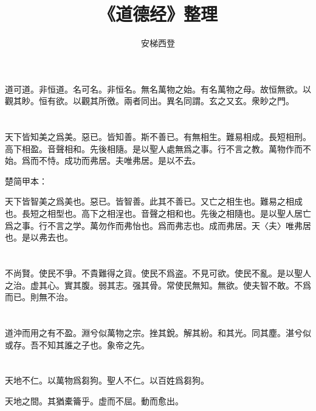 \documentclass[a5paper]{ctexbook}
\title{《道德经》整理}
\author{安梯西登}
\date{}
\begin{document}
    \maketitle

    \tableofcontents

    \chapter{}

    道可道。非恒道。名可名。非恒名。無名萬物之始。有名萬物之母。故恒無欲。以觀其眇。恒有欲。以觀其所徼。兩者同出。異名同謂。玄之又玄。衆眇之門。

    \chapter{}

    天下皆知美之爲美。惡已。皆知善。斯不善已。有無相生。難易相成。長短相刑。高下相盈。音聲相和。先後相隨。是以聖人處無爲之事。行不言之教。萬物作而不始。爲而不恃。成功而弗居。夫唯弗居。是以不去。

    楚简甲本：

    天下皆智美之爲美也。惡已。皆智善。此其不善已。又亡之相生也。難易之相成也。長短之相型也。高下之相浧也。音聲之相和也。先後之相隨也。是以聖人居亡爲之事。行不言之学。萬勿作而弗怡也。爲而弗志也。成而弗居。天〈夫〉唯弗居也。是以弗去也。

    \chapter{}

    不尚賢。使民不爭。不貴難得之貨。使民不爲盗。不見可欲。使民不亂。是以聖人之治。虚其心。實其腹。弱其志。强其骨。常使民無知。無欲。使夫智不敢。不爲而已。則無不治。

    \chapter{}

    道沖而用之有不盈。淵兮似萬物之宗。挫其銳。解其紛。和其光。同其塵。湛兮似或存。吾不知其誰之子也。象帝之先。

    \chapter{}

    天地不仁。以萬物爲芻狗。聖人不仁。以百姓爲芻狗。
    
    天地之間。其猶橐籥乎。虚而不屈。動而愈出。
    
\end{document}
